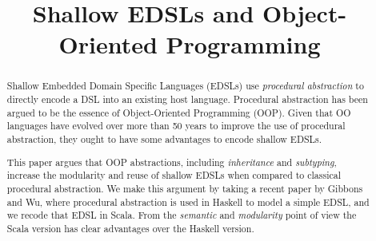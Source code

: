 \documentclass[10pt,preprint,nocopyrightspace]{sigplanconf}
\begin{document}
\setlength{\pdfpageheight}{\paperheight}
\setlength{\pdfpagewidth}{\paperwidth}




\title{Shallow EDSLs and Object-Oriented Programming}

\authorinfo{}
           {}
           {}

\maketitle

\begin{abstract}

Shallow Embedded Domain Specific Languages (EDSLs) use
\emph{procedural abstraction} to directly encode a DSL into an existing host language. Procedural abstraction has
been argued to be the essence of Object-Oriented Programming (OOP). Given
that OO languages have evolved over more than 50 years
to improve the use of procedural abstraction, they ought to have some
advantages to encode shallow EDSLs.

This paper argues that OOP abstractions, including \emph{inheritance}
and \emph{subtyping}, increase the modularity and reuse of shallow
EDSLs when compared to classical procedural abstraction. We make this
argument by taking a recent paper by Gibbons and Wu, where procedural
abstraction is used in Haskell to model a simple EDSL, and we recode
that EDSL in Scala. From the \emph{semantic}
and \emph{modularity} point of view the Scala version has clear advantages 
over the Haskell version. 

\end{abstract}
\end{document}
